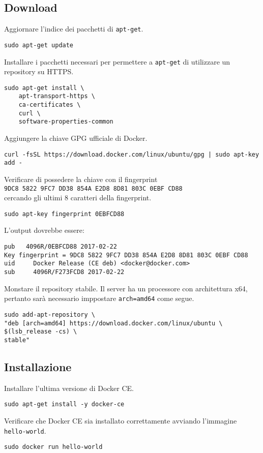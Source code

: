 \subsection{Download}
Aggiornare l'indice dei pacchetti di \verb|apt-get|.
\begin{lstlisting}
sudo apt-get update
\end{lstlisting}
Installare i pacchetti necessari per permettere a \verb|apt-get| di utilizzare un repository su HTTPS.
\begin{lstlisting}
sudo apt-get install \ 
    apt-transport-https \
    ca-certificates \
    curl \
    software-properties-common
\end{lstlisting}
Aggiungere la chiave GPG ufficiale di Docker.
\begin{lstlisting}
curl -fsSL https://download.docker.com/linux/ubuntu/gpg | sudo apt-key add -
\end{lstlisting}
Verificare di possedere la chiave con il fingerprint\\
\verb|9DC8 5822 9FC7 DD38 854A E2D8 8D81 803C 0EBF CD88|\\
cercando gli ultimi 8 caratteri della fingerprint.
\begin{lstlisting}
sudo apt-key fingerprint 0EBFCD88
\end{lstlisting}
L'output dovrebbe essere:
\begin{lstlisting}
pub   4096R/0EBFCD88 2017-02-22
Key fingerprint = 9DC8 5822 9FC7 DD38 854A E2D8 8D81 803C 0EBF CD88
uid     Docker Release (CE deb) <docker@docker.com>
sub     4096R/F273FCD8 2017-02-22
\end{lstlisting}
Monstare il repository stabile. Il server ha un processore con architettura x64, pertanto sarà necessario imppostare \verb|arch=amd64| come segue.
\begin{lstlisting}
sudo add-apt-repository \
"deb [arch=amd64] https://download.docker.com/linux/ubuntu \
$(lsb_release -cs) \
stable"
\end{lstlisting}

\subsection{Installazione}
Installare l'ultima versione di Docker CE.
\begin{lstlisting}
sudo apt-get install -y docker-ce
\end{lstlisting}
Verificare che Docker CE sia installato correttamente avviando l'immagine \verb|hello-world|.
\begin{lstlisting}
sudo docker run hello-world
\end{lstlisting}



